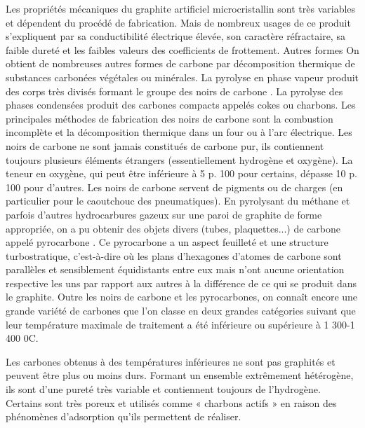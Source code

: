 \documentclass[a4 paper, 10 pt]{article}
\begin{document}
Les propriétés mécaniques du graphite artificiel microcristallin 
sont très variables et dépendent du procédé de fabrication. Mais de nombreux usages de ce produit s'expliquent par sa conductibilité électrique élevée, son
caractère réfractaire, sa faible dureté et les faibles
valeurs des coefficients de frottement.  Autres formes On obtient de
nombreuses autres formes de carbone par décomposition thermique de
substances carbonées végétales ou minérales. La pyrolyse
en phase vapeur produit des corps très divisés formant le groupe
des noirs de carbone . La pyrolyse des phases condensées produit
des carbones compacts appelés cokes ou charbons. Les principales
méthodes de fabrication des noirs de carbone sont la combustion
incomplète et la décomposition thermique dans un four ou à
l'arc électrique. Les noirs de carbone ne sont jamais constitués
de carbone pur, ils contiennent toujours plusieurs éléments
étrangers (essentiellement hydrogène et oxygène). La teneur
en oxygène, qui peut être inférieure à 5 p. 100 pour
certains, dépasse 10 p. 100 pour d'autres. Les noirs de carbone
servent de pigments ou de charges (en particulier pour le caoutchouc
des pneumatiques). En pyrolysant du méthane et parfois d'autres
hydrocarbures gazeux sur une paroi de graphite de forme appropriée,
on a pu obtenir des objets divers (tubes, plaquettes...) de carbone
appelé pyrocarbone . Ce pyrocarbone a un aspect feuilleté et
une structure turbostratique, c'est-à-dire où les plans
d'hexagones d'atomes de carbone sont parallèles et sensiblement
équidistants entre eux mais n'ont aucune orientation respective les
uns par rapport aux autres à la différence de ce qui se produit
dans le graphite.  Outre les noirs de carbone et les pyrocarbones, on
connaît encore une grande variété de carbones que l'on classe
en deux grandes catégories suivant que leur température maximale
de traitement a été inférieure ou supérieure à
1 300-1 400 0C. \newline 



Les carbones obtenus à des températures
inférieures ne sont pas graphités et peuvent être plus ou
moins durs. Formant un ensemble extrêmement hétérogène,
ils sont d'une pureté très variable et contiennent toujours de
l'hydrogène. Certains sont très poreux et utilisés comme
« charbons actifs » en raison des phénomènes
d'adsorption qu'ils permettent de réaliser.\newline 
\end{document}
